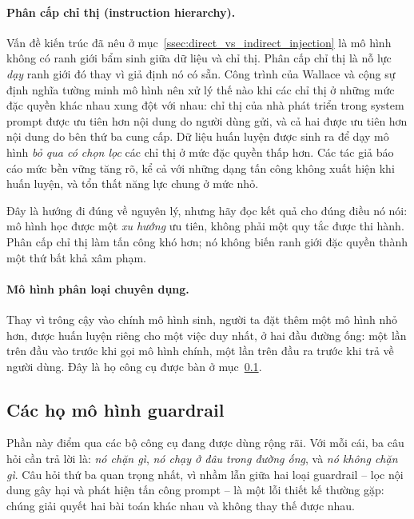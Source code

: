 \paragraph{Phân cấp chỉ thị (instruction hierarchy).} Vấn đề kiến trúc đã nêu ở mục~\ref{ssec:direct_vs_indirect_injection} là mô hình không có ranh giới bẩm sinh giữa dữ liệu và chỉ thị. Phân cấp chỉ thị là nỗ lực \emph{dạy} ranh giới đó thay vì giả định nó có sẵn. Công trình của Wallace và cộng sự \cite{wallace2024instructionhierarchy} định nghĩa tường minh mô hình nên xử lý thế nào khi các chỉ thị ở những mức đặc quyền khác nhau xung đột với nhau: chỉ thị của nhà phát triển trong system prompt được ưu tiên hơn nội dung do người dùng gửi, và cả hai được ưu tiên hơn nội dung do bên thứ ba cung cấp. Dữ liệu huấn luyện được sinh ra để dạy mô hình \emph{bỏ qua có chọn lọc} các chỉ thị ở mức đặc quyền thấp hơn. Các tác giả báo cáo mức bền vững tăng rõ, kể cả với những dạng tấn công không xuất hiện khi huấn luyện, và tổn thất năng lực chung ở mức nhỏ.

Đây là hướng đi đúng về nguyên lý, nhưng hãy đọc kết quả cho đúng điều nó nói: mô hình học được một \emph{xu hướng} ưu tiên, không phải một quy tắc được thi hành. Phân cấp chỉ thị làm tấn công khó hơn; nó không biến ranh giới đặc quyền thành một thứ bất khả xâm phạm.

\paragraph{Mô hình phân loại chuyên dụng.} Thay vì trông cậy vào chính mô hình sinh, người ta đặt thêm một mô hình nhỏ hơn, được huấn luyện riêng cho một việc duy nhất, ở hai đầu đường ống: một lần trên đầu vào trước khi gọi mô hình chính, một lần trên đầu ra trước khi trả về người dùng. Đây là họ công cụ được bàn ở mục~\ref{ssec:guardrail_models}.

\subsection{Các họ mô hình guardrail}
\label{ssec:guardrail_models}

Phần này điểm qua các bộ công cụ đang được dùng rộng rãi. Với mỗi cái, ba câu hỏi cần trả lời là: \emph{nó chặn gì}, \emph{nó chạy ở đâu trong đường ống}, và \emph{nó không chặn gì}. Câu hỏi thứ ba quan trọng nhất, vì nhầm lẫn giữa hai loại guardrail -- lọc nội dung gây hại và phát hiện tấn công prompt -- là một lỗi thiết kế thường gặp: chúng giải quyết hai bài toán khác nhau và không thay thế được nhau.

